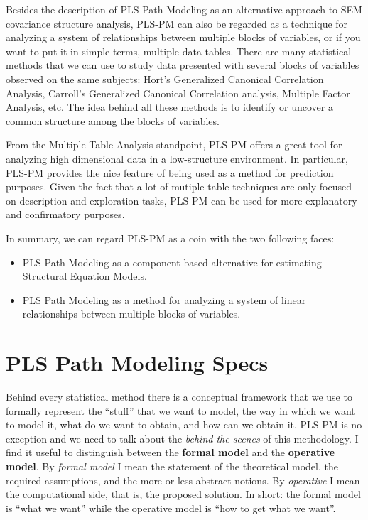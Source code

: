 \documentclass[12pt]{book}\usepackage{graphicx, color}
\begin{document}
Besides the description of PLS Path Modeling as an alternative approach to SEM covariance structure analysis, PLS-PM can also be regarded as a technique for analyzing a system of relationships between multiple blocks of variables, or if you want to put it in simple terms, multiple data tables. There are many statistical methods that we can use to study data presented with several blocks of variables observed on the same subjects: Hort's Generalized Canonical Correlation Analysis, Carroll's Generalized Canonical Correlation analysis, Multiple Factor Analysis, etc. The idea behind all these methods is to identify or uncover a common structure among the blocks of variables.

From the Multiple Table Analysis standpoint, PLS-PM offers a great tool for analyzing high dimensional data in a low-structure environment. In particular, PLS-PM provides the nice feature of being used as a method for prediction purposes. Given the fact that a lot of mutiple table techniques are only focused on description and exploration tasks, PLS-PM can be used for more explanatory and confirmatory purposes.

In summary, we can regard PLS-PM as a coin with the two following faces:
\begin{itemize}
 \item PLS Path Modeling as a component-based alternative for estimating Structural Equation Models.
 \item PLS Path Modeling as a method for analyzing a system of linear relationships between multiple blocks of variables.
\end{itemize}


\section{PLS Path Modeling Specs}
Behind every statistical method there is a conceptual framework that we use to formally represent the ``stuff'' that we want to model, the way in which we want to model it, what do we want to obtain, and how can we obtain it. PLS-PM is no exception and we need to talk about the \textit{behind the scenes} of this methodology. I find it useful to distinguish between the \textbf{formal model} and the \textbf{operative model}. By \textit{formal model} I mean the statement of the theoretical model, the required assumptions, and the more or less abstract notions. By \textit{operative} I mean the computational side, that is, the proposed solution. In short: the formal model is ``what we want'' while the operative model is ``how to get what we want''.
\end{document}
